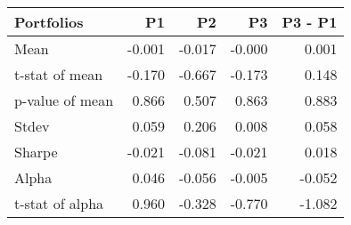 \begin{tabular}{lrrrr}
\toprule
Portfolios & P1 & P2 & P3 & P3 - P1 \\
\midrule
Mean & -0.001 & -0.017 & -0.000 & 0.001 \\
t-stat of mean & -0.170 & -0.667 & -0.173 & 0.148 \\
p-value of mean & 0.866 & 0.507 & 0.863 & 0.883 \\
Stdev & 0.059 & 0.206 & 0.008 & 0.058 \\
Sharpe & -0.021 & -0.081 & -0.021 & 0.018 \\
Alpha & 0.046 & -0.056 & -0.005 & -0.052 \\
t-stat of alpha & 0.960 & -0.328 & -0.770 & -1.082 \\
\bottomrule
\end{tabular}
